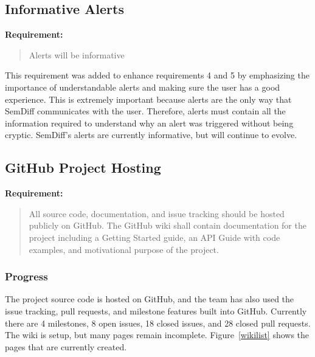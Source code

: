 \documentclass[draftclsnofoot,onecolumn]{IEEEtran}
\begin{document}
\subsection{Informative Alerts}%

\textbf{Requirement:}

\begin{quote}

Alerts will be informative

\end{quote}

This requirement was added to enhance requirements 4 and 5 by emphasizing the 
importance of understandable alerts and making sure the user has a good 
experience. This is extremely important because alerts are the only way that 
SemDiff communicates with the user. Therefore, alerts must contain all the 
information required to understand why an alert was triggered without being 
cryptic. SemDiff’s alerts are currently informative, but will continue to 
evolve.

\subsection{GitHub Project Hosting}%

\textbf{Requirement:}

\begin{quote}

All source code, documentation, and issue tracking should be hosted publicly 
on GitHub. The GitHub wiki shall contain documentation for the project 
including a Getting Started guide, an API Guide with code examples, and 
motivational purpose of the project.

\end{quote}

\subsubsection{Progress}
The project source code is hosted on GitHub, and the team has also used the 
issue tracking, pull requests, and milestone features built into GitHub. 
Currently there are 4 milestones, 8 open issues, 18 closed issues, and 28 
closed pull requests. The wiki is setup, but many pages remain incomplete. 
Figure~\ref{wikilist} shows the pages that are currently created.
\end{document}
